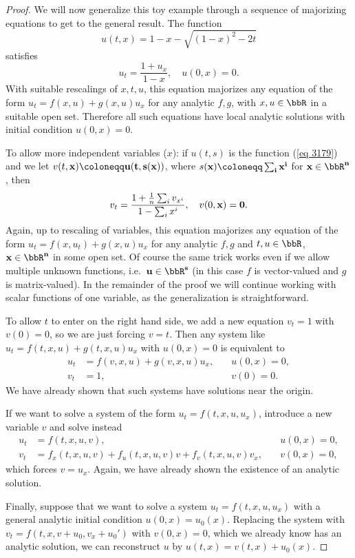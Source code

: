 \begin{proof}
    We will now generalize this toy example through a sequence of majorizing equations to get to the general result. The function 
    \[u(t,x)=1-x-\sqrt{(1-x)^2-2t}\label{eq 3179}\]
    satisfies 
    \[u_t=\frac{1+u_x}{1-x},\quad u(0,x)=0.\]
    With suitable rescalings of $x,t,u$, this equation majorizes any equation of the form $u_t=f(x,u)+g(x,u)u_x$ for any analytic $f,g$, with $x,u\in\bbR$ in a suitable open set. Therefore all such equations have local analytic solutions with initial condition $u(0,x)=0$.

    To allow more independent variables ($x$): if $u(t,s)$ is the function (\ref{eq 3179}) and we let $v(t,\bf{x})\coloneqq u(t,s(\bf{x}))$, where $s(\bf{x})\coloneqq \sum_i x^i$ for $\bf{x}\in\bbR^n$, then 
    \[v_t=\frac{1+\frac{1}{n}\sum_i v_{x^i}}{1-\sum_i x^i},\quad v(0,\bf{x})=0.\]
    Again, up to rescaling of variables, this equation majorizes any equation of the form $u_t=f(x,u_t)+g(x,u)u_x$ for any analytic $f,g$ and $t,u\in\bbR$, $\bf{x}\in\bbR^n$ in some open set. Of course the same trick works even if we allow multiple unknown functions, i.e.\ $\bf{u}\in\bbR^s$ (in this case $f$ is vector-valued and $g$ is matrix-valued). In the remainder of the proof we will continue working with scalar functions of one variable, as the generalization is straightforward.

    To allow $t$ to enter on the right hand side, we add a new equation $v_t=1$ with $v(0)=0$, so we are just forcing $v=t$. Then any system like $u_t=f(t,x,u)+g(t,x,u)u_x$ with $u(0,x)=0$ is equivalent to 
    \begin{align}
        u_t&=f(v,x,u)+g(v,x,u)u_x,\quad &u(0,x)=0,\\
        v_t&=1,\quad &v(0)=0.
    \end{align}
    We have already shown that such systems have solutions near the origin.

    If we want to solve a system of the form $u_t=f(t,x,u,u_x)$, introduce a new variable $v$ and solve instead 
    \begin{align}
        u_t&=f(t,x,u,v),\quad &u(0,x)=0,\\
        v_t&=f_x(t,x,u,v)+f_u(t,x,u,v)v+f_v(t,x,u,v)v_x,\quad &v(0,x)=0,
    \end{align}
    which forces $v=u_x$. Again, we have already shown the existence of an analytic solution.

    Finally, suppose that we want to solve a system $u_t=f(t,x,u,u_x)$ with a general analytic initial condition $u(0,x)=u_0(x)$. Replacing the system with $v_t=f(t,x,v+u_0,v_x+u_0')$ with $v(0,x)=0$, which we already know has an analytic solution, we can reconstruct $u$ by $u(t,x)=v(t,x)+u_0(x)$.
\end{proof}

